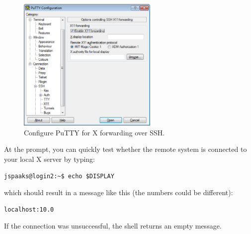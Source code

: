 \begin{figure}[htb]
  \centering
    \includegraphics[width=0.6\textwidth]{./../eps/putty-x-forwarding.eps}
  \caption{Configure PuTTY for X forwarding over SSH.}
  \label{fig:putty-x-forwarding}
\end{figure}

At the prompt, you can quickly test whether the remote system is connected to your local X server by typing:
\begin{lstlisting}[style=basic,style=bash]
jspaaks@login2:~$ echo $DISPLAY
\end{lstlisting}%
which should result in a message like this (the numbers could be different):
\begin{lstlisting}[style=basic,style=bash]
localhost:10.0
\end{lstlisting}
If the connection was unsuccessful, the shell returns an empty message.

